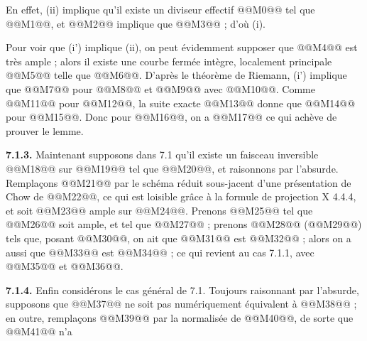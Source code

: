 
En
effet, (ii) implique qu'il existe un diviseur effectif @@M0@@ tel que @@M1@@, et @@M2@@ implique que @@M3@@ ; d'o\`u (i).

Pour voir que (i') implique (ii), on peut \'evidemment supposer que @@M4@@ est tr\`es ample ; alors il existe une courbe ferm\'ee int\`egre, localement principale @@M5@@ telle que @@M6@@. D'apr\`es le th\'eor\`eme de Riemann, (i') implique que @@M7@@ pour @@M8@@ et @@M9@@ avec @@M10@@. Comme @@M11@@ pour @@M12@@, la suite exacte
@@M13@@
donne que @@M14@@ pour @@M15@@. Donc pour @@M16@@, on a
@@M17@@
ce qui ach\`eve de prouver le lemme.

\textbf{7.1.3.} Maintenant supposons dans 7.1 qu'il existe un faisceau inversible @@M18@@ sur @@M19@@ tel que @@M20@@, et raisonnons par l'absurde. Rempla\c{c}ons @@M21@@ par le sch\'ema r\'eduit sous-jacent d'une pr\'esentation de Chow de @@M22@@, ce qui est loisible gr\^ace \`a la formule de projection X 4.4.4, et soit @@M23@@ ample sur @@M24@@. Prenons @@M25@@ tel que @@M26@@ soit ample, et tel que @@M27@@ ; prenons @@M28@@ (@@M29@@) tels que, posant @@M30@@, on ait que @@M31@@ est @@M32@@ ; alors on a aussi que @@M33@@ est @@M34@@ ; ce qui revient au cas 7.1.1, avec @@M35@@ et @@M36@@.

\textbf{7.1.4.} Enfin consid\'erons le cas g\'en\'eral de 7.1. Toujours raisonnant par l'absurde, supposons que @@M37@@ ne soit pas num\'eriquement \'equivalent \`a @@M38@@ ; en outre, rempla\c{c}ons @@M39@@ par la normalis\'ee de @@M40@@, de sorte que @@M41@@ n'a 
